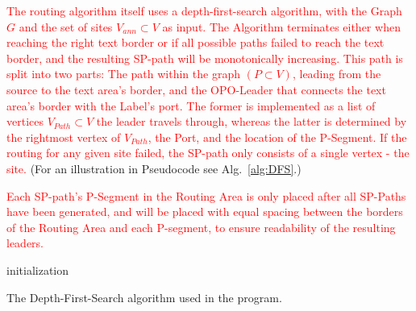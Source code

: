 \documentclass[11pt,a4paper]{vutinfth}
\newcommand{\change}[1]{\textcolor{red}{#1}}
\begin{document}
\change{The routing algorithm itself uses a depth-first-search algorithm, with the Graph $G$ and the set of sites $V_{ann} \subset V$ as input. The Algorithm terminates either when reaching the right text border or if all possible paths failed to reach the text border, and the resulting SP-path will be monotonically increasing. This path is split into two parts: The path within the graph $(P \subset V)$, leading from the source to the text area's border, and the OPO-Leader that connects the text area's border with the Label's port. The former is implemented as a list of vertices $V_{Path} \subset V$ the leader travels through, whereas the latter is determined by the rightmost vertex of $V_{Path}$, the Port, and the location of the P-Segment. If the routing for any given site failed, the SP-path only consists of a single vertex - the site.} (For an illustration in Pseudocode see Alg.~\ref{alg:DFS}.)

\change{Each SP-path's P-Segment in the Routing Area is only placed after all SP-Paths have been generated, and will be placed with equal spacing between the borders of the Routing Area and each P-segment, to ensure readability of the resulting leaders.}

\begin{algorithm}

\DontPrintSemicolon
{}



initialization\;
\caption{The Depth-First-Search algorithm used in the program.}
\label{alg:DFS}
\end{algorithm}
\end{document}
